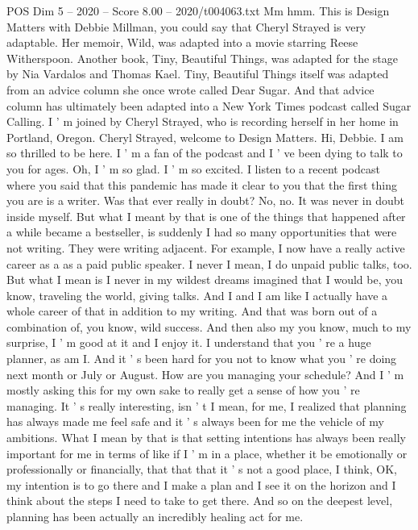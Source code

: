 \begin{textsample}{POS Dim 5 – 2020 – Score 8.00 – 2020/t004063.txt}  \label{ex:f5_pos_063}
Mm hmm.
This is Design Matters with Debbie Millman, you could say that Cheryl Strayed is very adaptable.
Her memoir, Wild, was adapted into a movie starring Reese Witherspoon.
Another book, Tiny, Beautiful Things, was adapted for the stage by Nia Vardalos and Thomas Kael.
Tiny, Beautiful Things itself was adapted from an advice column she once wrote called Dear Sugar.
And that advice column has ultimately been adapted into a New York Times podcast called Sugar Calling.
I ' m joined by Cheryl Strayed, who is recording herself in her home in Portland, Oregon.
Cheryl Strayed, welcome to Design Matters.
Hi, Debbie.
I am so thrilled to be here.
I ' m a fan of the podcast and I ' ve been dying to talk to you for ages.
Oh, I ' m so glad.
I ' m so excited.
I listen to a recent podcast where you said that this pandemic has made it clear to you that the first thing you are is a writer.
Was that ever really in doubt?
No, no.
It was never in doubt inside myself.
But what I meant by that is one of the things that happened after a while became a bestseller, is suddenly I had so many opportunities that were not writing.
They were writing adjacent.
For example, I now have a really active career as a as a paid public speaker.
I never I mean, I do unpaid public talks, too.
But what I mean is I never in my wildest dreams imagined that I would be, you know, traveling the world, giving talks.
And I and I am like I actually have a whole career of that in addition to my writing.
And that was born out of a combination of, you know, wild success.
And then also my you know, much to my surprise, I ' m good at it and I enjoy it.
I understand that you ' re a huge planner, as am I.
And it ' s been hard for you not to know what you ' re doing next month or July or August.
How are you managing your schedule?
And I ' m mostly asking this for my own sake to really get a sense of how you ' re managing.
It ' s really interesting, isn ' t I mean, for me, I realized that planning has always made me feel safe and it ' s always been for me the vehicle of my ambitions.
What I mean by that is that setting intentions has always been really important for me in terms of like if I ' m in a place, whether it be emotionally or professionally or financially, that that that it ' s not a good place, I think, OK, my intention is to go there and I make a plan and I see it on the horizon and I think about the steps I need to take to get there.
And so on the deepest level, planning has been actually an incredibly healing act for me.

\end{textsample}

